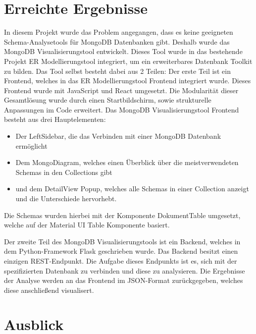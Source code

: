 \section{Erreichte Ergebnisse}
\label{sec:ergebnisse}

\iffalse
Die Zusammenfassung dient dazu, die wesentlichen Ergebnisse des 
Praktikums und vor allem die entwickelte Problemlösung und den 
erreichten Fortschritt darzustellen. (Sie haben Ihr Ziel erreicht und 
dies nachgewiesen).
\fi

In diesem Projekt wurde das Problem angegangen, dass es keine geeigneten Schema-Analysetools für MongoDB Datenbanken gibt.
Deshalb wurde das MongoDB Visualisierungstool entwickelt.
Dieses Tool wurde in das bestehende Projekt ER Modellierungstool integriert, um ein erweiterbares Datenbank Toolkit zu bilden.
Das Tool selbst besteht dabei aus 2 Teilen:
Der erste Teil ist ein Frontend, welches in das ER Modellierungstool Frontend integriert wurde.
Dieses Frontend wurde mit JavaScript und React umgesetzt.
Die Modularität dieser Gesamtlösung wurde durch einen Startbildschirm, sowie strukturelle Anpassungen im Code erweitert.
Das MongoDB Visualisierungstool Frontend besteht aus drei Hauptelementen:
\begin{itemize}
    \item Der LeftSidebar, die das Verbinden mit einer MongoDB Datenbank ermöglicht
    \item Dem MongoDiagram, welches einen Überblick über die meistverwendeten Schemas in den Collections gibt
    \item und dem DetailView Popup, welches alle Schemas in einer Collection anzeigt und die Unterschiede hervorhebt.
\end{itemize}

Die Schemas wurden hierbei mit der Komponente DokumentTable umgesetzt, welche auf der Material UI Table Komponente basiert.

Der zweite Teil des MongoDB Visualisierungstools ist ein Backend, welches in dem Python-Framework Flask geschrieben wurde.
Das Backend besitzt einen einzigen REST-Endpunkt.
Die Aufgabe dieses Endpunkts ist es, sich mit der spezifizierten Datenbank zu verbinden und diese zu analysieren.
Die Ergebnisse der Analyse werden an das Frontend im JSON-Format zurückgegeben, welches diese anschließend visualisert.

\section{Ausblick}
\label{sec:ausblick}

